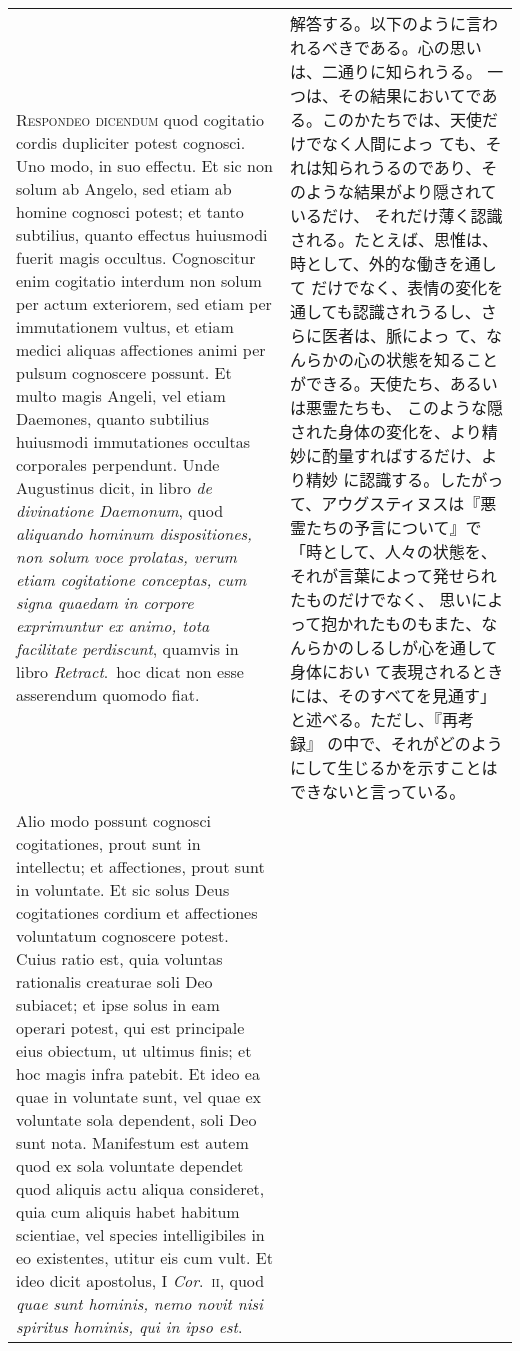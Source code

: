 \documentclass[10pt]{jsarticle} %
\begin{document}
\begin{longtable}{p{21em}p{21em}}
{\scshape Respondeo dicendum} quod cogitatio cordis
 dupliciter potest cognosci. Uno modo, in suo effectu. Et sic non solum
 ab Angelo, sed etiam ab homine cognosci potest; et tanto subtilius,
 quanto effectus huiusmodi fuerit magis occultus. Cognoscitur enim
 cogitatio interdum non solum per actum exteriorem, sed etiam per
 immutationem vultus, et etiam medici aliquas affectiones animi per
 pulsum cognoscere possunt. Et multo magis Angeli, vel etiam Daemones,
 quanto subtilius huiusmodi immutationes occultas corporales
 perpendunt. Unde Augustinus dicit, in libro {\itshape de divinatione Daemonum},
 quod {\itshape aliquando hominum dispositiones, non solum voce prolatas, verum
 etiam cogitatione conceptas, cum signa quaedam in corpore exprimuntur
 ex animo, tota facilitate perdiscunt}, quamvis in libro {\itshape Retract}.~hoc
 dicat non esse asserendum quomodo fiat.


&

解答する。以下のように言われるべきである。心の思いは、二通りに知られうる。
 一つは、その結果においてである。このかたちでは、天使だけでなく人間によっ
 ても、それは知られうるのであり、そのような結果がより隠されているだけ、
 それだけ薄く認識される。たとえば、思惟は、時として、外的な働きを通して
 だけでなく、表情の変化を通しても認識されうるし、さらに医者は、脈によっ
 て、なんらかの心の状態を知ることができる。天使たち、あるいは悪霊たちも、
 このような隠された身体の変化を、より精妙に酌量すればするだけ、より精妙
 に認識する。したがって、アウグスティヌスは『悪霊たちの予言について』で
 「時として、人々の状態を、それが言葉によって発せられたものだけでなく、
 思いによって抱かれたものもまた、なんらかのしるしが心を通して身体におい
 て表現されるときには、そのすべてを見通す」と述べる。ただし、『再考録』
 の中で、それがどのようにして生じるかを示すことはできないと言っている。



 \\

 
 Alio modo possunt cognosci
 cogitationes, prout sunt in intellectu; et affectiones, prout sunt in
 voluntate. Et sic solus Deus cogitationes cordium et affectiones
 voluntatum cognoscere potest. Cuius ratio est, quia voluntas rationalis
 creaturae soli Deo subiacet; et ipse solus in eam operari potest, qui
 est principale eius obiectum, ut ultimus finis; et hoc magis infra
 patebit. Et ideo ea quae in voluntate sunt, vel quae ex voluntate sola
 dependent, soli Deo sunt nota. Manifestum est autem quod ex sola
 voluntate dependet quod aliquis actu aliqua consideret, quia cum
 aliquis habet habitum scientiae, vel species intelligibiles in eo
 existentes, utitur eis cum vult. Et ideo dicit apostolus, I {\itshape Cor}.~{\scshape ii},
 quod {\itshape quae sunt hominis, nemo novit nisi spiritus hominis, qui in ipso
 est}.


\end{longtable}
\end{document}
